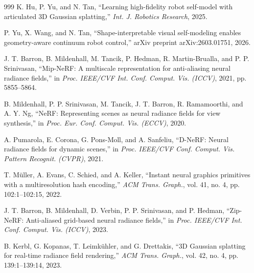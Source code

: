 \documentclass[12pt,a4paper,oneside]{report}
\begin{document}
\begin{thebibliography}{999}
K. Hu, P. Yu, and N. Tan, ``Learning high-fidelity robot self-model with articulated {3D} Gaussian splatting,'' \textit{Int. J. Robotics Research}, 2025.




P. Yu, X. Wang, and N. Tan, ``Shape-interpretable visual self-modeling enables geometry-aware continuum robot control,'' arXiv preprint arXiv:2603.01751, 2026.




J. T. Barron, B. Mildenhall, M. Tancik, P. Hedman, R. Martin-Brualla, and P. P. Srinivasan, ``{Mip-NeRF}: A multiscale representation for anti-aliasing neural radiance fields,'' in \textit{Proc. IEEE/CVF Int. Conf. Comput. Vis. (ICCV)}, 2021, pp. 5855--5864.




B. Mildenhall, P. P. Srinivasan, M. Tancik, J. T. Barron, R. Ramamoorthi, and A. Y. Ng, ``NeRF: Representing scenes as neural radiance fields for view synthesis,'' in \textit{Proc. Eur. Conf. Comput. Vis. (ECCV)}, 2020.




A. Pumarola, E. Corona, G. Pons-Moll, and A. Sanfeliu, ``D-NeRF: Neural radiance fields for dynamic scenes,'' in \textit{Proc. IEEE/CVF Conf. Comput. Vis. Pattern Recognit. (CVPR)}, 2021.




T. M\"uller, A. Evans, C. Schied, and A. Keller, ``Instant neural graphics primitives with a multiresolution hash encoding,'' \textit{ACM Trans. Graph.}, vol. 41, no. 4, pp. 102:1--102:15, 2022.




J. T. Barron, B. Mildenhall, D. Verbin, P. P. Srinivasan, and P. Hedman, ``Zip-NeRF: Anti-aliased grid-based neural radiance fields,'' in \textit{Proc. IEEE/CVF Int. Conf. Comput. Vis. (ICCV)}, 2023.





B. Kerbl, G. Kopanas, T. Leimk\"{u}hler, and G. Drettakis, ``{3D} Gaussian splatting for real-time radiance field rendering,'' \textit{ACM Trans. Graph.}, vol. 42, no. 4, pp. 139:1--139:14, 2023.




\end{thebibliography}
\end{document}
